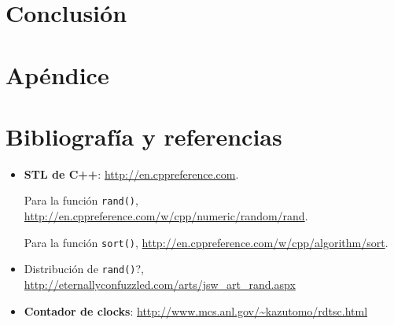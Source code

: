 	
	
\section{Conclusión}

\section{Apéndice}

\section{Bibliografía y referencias} %

\begin{itemize}
	\item \textbf{STL de C++}: \url{http://en.cppreference.com}.
	\par Para la función \texttt{rand()}, \url{http://en.cppreference.com/w/cpp/numeric/random/rand}.
	\par Para la función \texttt{sort()}, \url{http://en.cppreference.com/w/cpp/algorithm/sort}.
	\item Distribución de \texttt{rand()}?, \url{http://eternallyconfuzzled.com/arts/jsw\_art\_rand.aspx}
	\item \textbf{Contador de clocks}: \url{http://www.mcs.anl.gov/\~kazutomo/rdtsc.html}
\end{itemize}



